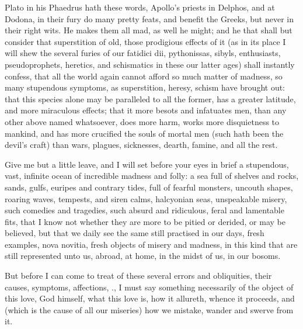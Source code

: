 {Plato in his Phaedrus hath these words, Apollo's priests in
Delphos, and at Dodona, in their fury do many pretty feats, and benefit
the Greeks, but never in their right wits. He makes them all mad, as
well he might; and he that shall but consider that superstition of old,
those prodigious effects of it (as in its place I will shew the several
furies of our fatidici dii, pythonissas, sibyls, enthusiasts,
pseudoprophets, heretics, and schismatics in these our latter ages)
shall instantly confess, that all the world again cannot afford so much
matter of madness, so many stupendous symptoms, as superstition,
heresy, schism have brought out: that this species alone may be
paralleled to all the former, has a greater latitude, and more
miraculous effects; that it more besots and infatuates men, than any
other above named whatsoever, does more harm, works more disquietness
to mankind, and has more crucified the souls of mortal men (such hath
been the devil's craft) than wars, plagues, sicknesses, dearth, famine,
and all the rest.

Give me but a little leave, and I will set before your eyes in brief a
stupendous, vast, infinite ocean of incredible madness and folly: a sea
full of shelves and rocks, sands, gulfs, euripes and contrary tides,
full of fearful monsters, uncouth shapes, roaring waves, tempests, and
siren calms, halcyonian seas, unspeakable misery, such comedies and
tragedies, such absurd and ridiculous, feral and lamentable fits, that
I know not whether they are more to be pitied or derided, or may be
believed, but that we daily see the same still practised in our days,
fresh examples, nova novitia, fresh objects of misery and madness, in
this kind that are still represented unto us, abroad, at home, in the
midst of us, in our bosoms.

But before I can come to treat of these several errors and obliquities,
their causes, symptoms, affections, \etc{}., I must say something
necessarily of the object of this love, God himself, what this love is,
how it allureth, whence it proceeds, and (which is the cause of all our
miseries) how we mistake, wander and swerve from it.

}

